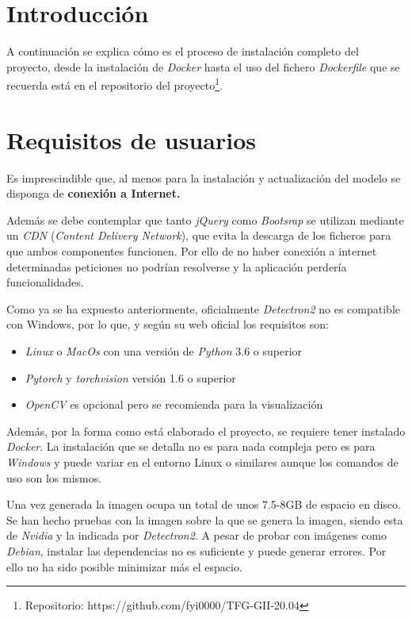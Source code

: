 
\section{Introducción}
A continuación se explica cómo es el proceso de instalación completo del proyecto, desde la instalación de \emph{Docker} hasta el uso del fichero \emph{Dockerfile} que se recuerda está en el repositorio del proyecto\footnote{Repositorio: https://github.com/fyi0000/TFG-GII-20.04}.

\section{Requisitos de usuarios}
Es imprescindible que, al menos para la instalación y actualización del modelo se disponga de \textbf{conexión a Internet.}

Además se debe contemplar que tanto \emph{jQuery} como \emph{Bootsrap} se utilizan mediante un \emph{CDN} (\emph{Content Delivery Network}), que evita la descarga de los ficheros para que ambos componentes funcionen. Por ello de no haber conexión a internet determinadas peticiones no podrían resolverse y la aplicación perdería funcionalidades.

Como ya se ha expuesto anteriormente, oficialmente \emph{Detectron2} no es compatible con Windows, por lo que, y según su web oficial\cite{detecron2:instalacion} los requisitos son:

\begin{itemize}
    \item \emph{Linux} o \emph{MacOs} con una versión de \emph{Python} 3.6 o superior
    \item \emph{Pytorch} y \emph{torchvision} versión 1.6 o superior
    \item \emph{OpenCV} es opcional pero se recomienda para la visualización
\end{itemize}

Además, por la forma como está elaborado el proyecto, se requiere tener instalado \emph{Docker}. La instalación que se detalla no es para nada compleja pero es para \emph{Windows} y puede variar en el entorno Linux o similares aunque los comandos de uso son los mismos.


Una vez generada la imagen ocupa un total de unos 7.5-8GB de espacio en disco. Se han hecho pruebas con la imagen sobre la que se genera la imagen, siendo esta de \emph{Nvidia} y la indicada por \emph{Detectron2}. A pesar de probar con imágenes como \emph{Debian}, instalar las dependencias no es suficiente y puede generar errores. Por ello no ha sido posible minimizar más el espacio.

